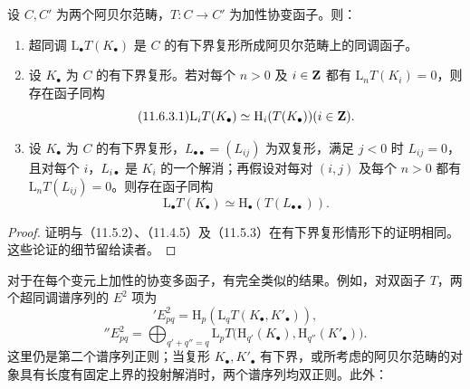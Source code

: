 设 $C,C'$ 为两个阿贝尔范畴，$T:C\to C'$ 为加性协变函子。则：
\begin{enumerate}[label=(\roman*)]
\item 超同调 $\mathrm L_\bullet T(K_\bullet)$ 是 $C$ 的有下界复形所成阿贝尔范畴上的同调函子。
\item 设 $K_\bullet$ 为 $C$ 的有下界复形。若对每个 $n>0$ 及 $i\in\mathbf Z$ 都有 $\mathrm L_nT(K_i)=0$，则存在函子同构
\begin{equation}\tag{11.6.3.1}
\mathrm L_iT(K_\bullet)\simeq\mathrm H_i(T(K_\bullet))\qquad(i\in\Z).
\end{equation}
\item 设 $K_\bullet$ 为 $C$ 的有下界复形，$L_{\bullet\bullet}=(L_{ij})$ 为双复形，满足 $j<0$ 时 $L_{ij}=0$，且对每个 $i$，$L_{i\bullet}$ 是 $K_i$ 的一个解消；再假设对每对 $(i,j)$ 及每个 $n>0$ 都有 $\mathrm L_nT(L_{ij})=0$。则存在函子同构
\begin{equation}\tag{11.6.3.2}
\mathrm L_\bullet T(K_\bullet)\simeq\mathrm H_\bullet(T(L_{\bullet\bullet})).
\end{equation}
\end{enumerate}
\begin{proof}
证明与（11.5.2）、（11.4.5）及（11.5.3）在有下界复形情形下的证明相同。这些论证的细节留给读者。
\end{proof}

对于在每个变元上加性的协变多函子，有完全类似的结果。例如，对双函子 $T$，两个超同调谱序列的 $E^2$ 项为
\begin{equation}\tag{11.6.4.1}
{}'E^2_{pq}=\mathrm H_p(\mathrm L_qT(K_\bullet,K'_\bullet)),
\end{equation}
\begin{equation}\tag{11.6.4.2}
{}''E^2_{pq}=\bigoplus_{q'+q''=q}\mathrm L_pT\bigl(\mathrm H_{q'}(K_\bullet),\mathrm H_{q''}(K'_\bullet)\bigr).
\end{equation}
这里仍是第二个谱序列正则；当复形 $K_\bullet,K'_\bullet$ 有下界，或所考虑的阿贝尔范畴的对象具有长度有固定上界的投射解消时，两个谱序列均双正则。此外：


